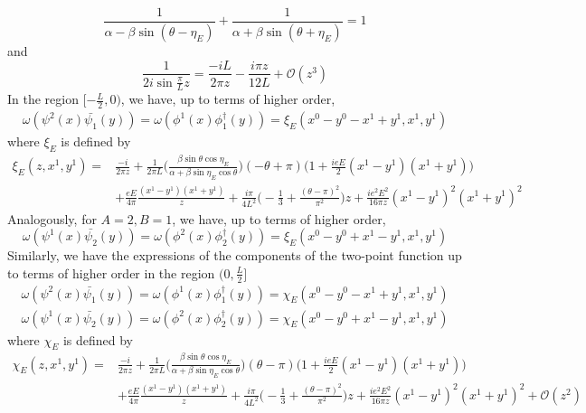 \begin{equation}\label{nef-lourdeur}
\frac{1}{\alpha - \beta \sin (\theta - \eta_E)}
   + \frac{1}{\alpha + \beta \sin (\theta + \eta_E)} 
= 1
\end{equation}
and
\begin{equation*}
\frac{1}{2i \sin \frac{\pi}{L}z } = \frac{-iL}{2 \pi z} - \frac{i \pi z}{12L} + \mathcal{O}(z^3) 
\end{equation*}
In the region $[-\frac{L}{2}, 0)$, we have, up to terms of higher order,
\begin{equation*}
\begin{split}
\omega(\psi^2(x) \bar{\psi_1}(y)) = 
\omega(\phi^1(x) \phi^\dagger_1(y)) = \xi_E(x^0 - y^0 - x^1 + y^1, x^1, y^1) 
\end{split}
\end{equation*}
where $\xi_E$ is defined by
\begin{equation}\label{vacuum-xie}
\begin{split}
\xi_E(z, x^1, y^1)
= & \frac{-i}{2 \pi z} + \frac{1}{2\pi L}\Big( \frac{\beta \sin \theta \cos \eta_E}{\alpha + \beta \sin \eta_E \cos \theta}\Big) (-\theta + \pi) 
\Big(1+ \frac{ieE}{2}(x^1 - y^1)(x^1 + y^1) \Big) \\
& + \frac{eE}{4 \pi}\frac{(x^1 - y^1)(x^1 + y^1)}{z}     
+ \frac{i\pi}{4 L^2}\big( -\frac{1}{3} + \frac{(\theta - \pi)^2}{\pi^2}\big)z
+ \frac{i e^2 E^2}{16 \pi z} (x^1 - y^1)^2 (x^1 + y^1)^2
\end{split}
\end{equation}
Analogously, for $A=2,B=1$, we have, up to terms of higher order,
\begin{equation*}
 \omega(\psi^1(x) \bar{\psi_2}(y)) = 
\omega(\phi^2(x) \phi^\dagger_2(y)) = \xi_E(x^0 - y^0 + x^1 - y^1, x^1, y^1)
\end{equation*}
Similarly, we have the expressions of the components of the two-point function up to terms of higher order in the region $(0, \frac{L}{2}]$
\begin{equation*}
\begin{split}
\omega(\psi^2(x) \bar{\psi_1}(y)) = 
\omega(\phi^1(x) \phi^\dagger_1(y)) = \chi_E(x^0 - y^0 - x^1 + y^1, x^1, y^1) \\
 \omega(\psi^1(x) \bar{\psi_2}(y)) = 
\omega(\phi^2(x) \phi^\dagger_2(y)) = \chi_E(x^0 - y^0 + x^1 - y^1, x^1, y^1)
\end{split}
\end{equation*}
where $\chi_E$ is defined by
\begin{equation}\label{vacuum-chie}
\begin{split}
\chi_E(z, x^1, y^1) = 
& \frac{-i}{2 \pi z} + \frac{1}{2\pi L}\Big( \frac{\beta \sin \theta \cos \eta_E}{\alpha + \beta \sin \eta_E \cos \theta}\Big) (\theta - \pi)\Big(1+ \frac{ieE}{2}(x^1 - y^1)(x^1 + y^1) \Big) \\
&+ \frac{eE}{4 \pi}\frac{(x^1 - y^1)(x^1 + y^1)}{z}  
+ \frac{i\pi}{4 L^2}\big( -\frac{1}{3} + \frac{(\theta - \pi)^2}{\pi^2}\big)z
+ \frac{i e^2 E^2}{16 \pi z} (x^1 - y^1)^2 (x^1 + y^1)^2
+ \mathcal{O}(z^2)
\end{split}
\end{equation}

